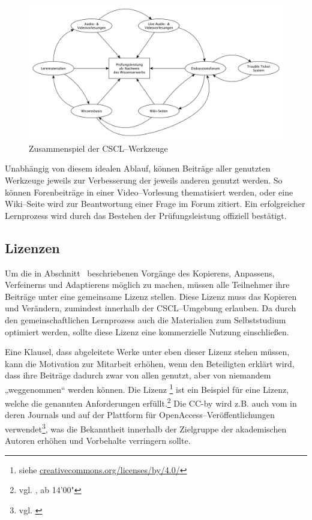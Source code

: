 \begin{figure}[H]
\begin{center}
\includegraphics[width=\textwidth]{tools.jpg}
\caption{Zusammenspiel der CSCL–Werkzeuge}
\label{fig:toos}
\end{center}
\end{figure}

Unabhängig von diesem idealen Ablauf, können Beiträge aller genutzten Werkzeuge jeweils zur Verbesserung der jeweils anderen genutzt werden. So können Forenbeiträge in einer Video–Vorlesung thematisiert werden, oder eine Wiki–Seite wird zur Beantwortung einer Frage im Forum zitiert. Ein erfolgreicher Lernprozess wird durch das Bestehen der Prüfungsleistung offiziell bestätigt.

\subsection{Lizenzen} %
\label{sub:lizenzen}
Um die in Abschnitt~ beschriebenen Vorgänge des Kopierens, Anpassens, Verfeinerns und Adaptierens möglich zu machen, müssen alle Teilnehmer ihre Beiträge unter eine gemeinsame Lizenz stellen. Diese Lizenz muss das Kopieren und Verändern, zumindest innerhalb der \ac{CSCL}–Umgebung erlauben. Da durch den gemeinschaftlichen Lernprozess auch die Materialien zum Selbststudium optimiert werden, sollte diese Lizenz eine kommerzielle Nutzung einschließen. 

Eine Klausel, dass abgeleitete Werke unter eben dieser Lizenz stehen müssen, kann die Motivation zur Mitarbeit erhöhen, wenn den Beteiligten erklärt wird, dass ihre Beiträge dadurch zwar von allen genutzt, aber von niemandem „weggenommen“ werden können. Die Lizenz \footnote{siehe \url{creativecommons.org/licenses/by/4.0/}} ist ein Beispiel für eine Lizenz, welche die genannten Anforderungen erfüllt.\footnote{vgl. \cite{baraniuk}, ab 14'00"} Die \ac{CC-by} wird z.B. auch vom  in deren Journals und auf der Plattform  für OpenAccess–Veröffentlichungen verwendet\footnote{vgl. \cite{springercc}}, was die Bekanntheit innerhalb der Zielgruppe der akademischen Autoren erhöhen und Vorbehalte verringern sollte.

